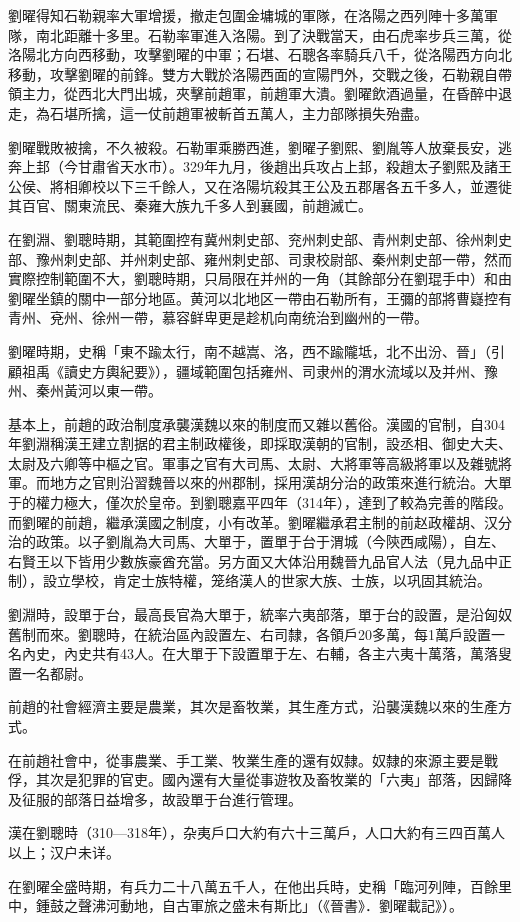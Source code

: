 劉曜得知石勒親率大軍增援，撤走包圍金墉城的軍隊，在洛陽之西列陣十多萬軍隊，南北距離十多里。石勒率軍進入洛陽。到了決戰當天，由石虎率步兵三萬，從洛陽北方向西移動，攻擊劉曜的中軍；石堪、石聰各率騎兵八千，從洛陽西方向北移動，攻擊劉曜的前鋒。雙方大戰於洛陽西面的宣陽門外，交戰之後，石勒親自帶領主力，從西北大門出城，夾擊前趙軍，前趙軍大潰。劉曜飲酒過量，在昏醉中退走，為石堪所擒，這一仗前趙軍被斬首五萬人，主力部隊損失殆盡。

劉曜戰敗被擒，不久被殺。石勒軍乘勝西進，劉曜子劉熙、劉胤等人放棄長安，逃奔上邽（今甘肅省天水市）。329年九月，後趙出兵攻占上邽，殺趙太子劉熙及諸王公侯、將相卿校以下三千餘人，又在洛陽坑殺其王公及五郡屠各五千多人，並遷徙其百官、關東流民、秦雍大族九千多人到襄國，前趙滅亡。

在劉淵、劉聰時期，其範圍控有冀州刺史部、兖州刺史部、青州刺史部、徐州刺史部、豫州刺史部、并州刺史部、雍州刺史部、司隶校尉部、秦州刺史部一帶，然而實際控制範圍不大，劉聰時期，只局限在并州的一角（其餘部分在劉琨手中）和由劉曜坐鎮的關中一部分地區。黄河以北地区一帶由石勒所有，王彌的部將曹嶷控有青州、兗州、徐州一帶，慕容鲜卑更是趁机向南统治到幽州的一帶。

劉曜時期，史稱「東不踰太行，南不越嵩、洛，西不踰隴坻，北不出汾、晉」（引顧祖禹《讀史方輿紀要》），疆域範圍包括雍州、司隶州的渭水流域以及并州、豫州、秦州黃河以東一帶。

基本上，前趙的政治制度承襲漢魏以來的制度而又雜以舊俗。漢國的官制，自304年劉淵稱漢王建立割据的君主制政權後，即採取漢朝的官制，設丞相、御史大夫、太尉及六卿等中樞之官。軍事之官有大司馬、太尉、大將軍等高級將軍以及雜號將軍。而地方之官則沿習魏晉以來的州郡制，採用漢胡分治的政策來進行統治。大單于的權力極大，僅次於皇帝。到劉聰嘉平四年（314年），達到了較為完善的階段。而劉曜的前趙，繼承漢國之制度，小有改革。劉曜繼承君主制的前赵政權胡、汉分治的政策。以子劉胤為大司馬、大單于，置單于台于渭城（今陝西咸陽），自左、右賢王以下皆用少數族豪酋充當。另方面又大体沿用魏晉九品官人法（見九品中正制），設立學校，肯定士族特權，笼络漢人的世家大族、士族，以巩固其統治。

劉淵時，設單于台，最高長官為大單于，統率六夷部落，單于台的設置，是沿匈奴舊制而來。劉聰時，在統治區內設置左、右司隸，各領戶20多萬，每1萬戶設置一名內史，內史共有43人。在大單于下設置單于左、右輔，各主六夷十萬落，萬落叟置一名都尉。

前趙的社會經濟主要是農業，其次是畜牧業，其生產方式，沿襲漢魏以來的生產方式。

在前趙社會中，從事農業、手工業、牧業生產的還有奴隸。奴隸的來源主要是戰俘，其次是犯罪的官吏。國內還有大量從事遊牧及畜牧業的「六夷」部落，因歸降及征服的部落日益增多，故設單于台進行管理。

漢在劉聰時（310—318年），杂夷戶口大約有六十三萬戶，人口大約有三四百萬人以上；汉户未详。

在劉曜全盛時期，有兵力二十八萬五千人，在他出兵時，史稱「臨河列陣，百餘里中，鍾鼓之聲沸河動地，自古軍旅之盛未有斯比」（《晉書》．劉曜載記》）。






